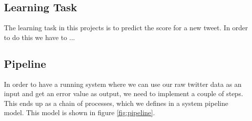 \subsection{Learning Task} %
\label{sub:learning_task}
The learning task in this projects is to predict the score for a new tweet. In order to do this we have to ...

\subsection{Pipeline} %
\label{sub:pipeline}

In order to have a running system where we can use our raw twitter data as an input and get an error value as output, we need to implement a couple of steps. This ends up as a chain of processes, which we defines in a system pipeline model. This model is shown in figure \ref{fig:pipeline}.

